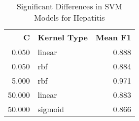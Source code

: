 \begin{table}[!htbp]
\centering
\caption{Significant Differences in SVM Models for Hepatitis}
\label{tab:svm_significant_pairs_hepatitis}
\begin{tabular}{rlr}
\toprule
C & Kernel Type & Mean F1 \\
\midrule
0.050 & linear & 0.888 \\
0.050 & rbf & 0.884 \\
5.000 & rbf & 0.971 \\
50.000 & linear & 0.883 \\
50.000 & sigmoid & 0.866 \\
\bottomrule
\end{tabular}
\end{table}
